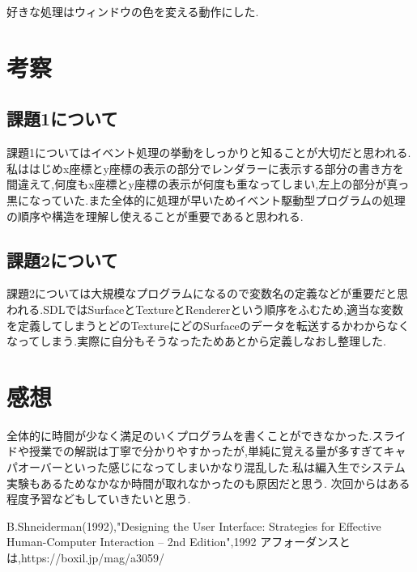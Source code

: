 \documentclass{jarticle}
\begin{document}
	好きな処理はウィンドウの色を変える動作にした.

	\section{考察}
	\subsection{課題1について}
	課題1についてはイベント処理の挙動をしっかりと知ることが大切だと思われる.私ははじめx座標とy座標の表示の部分でレンダラーに表示する部分の書き方を間違えて,何度もx座標とy座標の表示が何度も重なってしまい,左上の部分が真っ黒になっていた.また全体的に処理が早いためイベント駆動型プログラムの処理の順序や構造を理解し使えることが重要であると思われる.
	\subsection{課題2について}
	課題2については大規模なプログラムになるので変数名の定義などが重要だと思われる.SDLではSurfaceとTextureとRendererという順序をふむため,適当な変数を定義してしまうとどのTextureにどのSurfaceのデータを転送するかわからなくなってしまう.実際に自分もそうなったためあとから定義しなおし整理した.
	\section{感想}
	全体的に時間が少なく満足のいくプログラムを書くことができなかった.スライドや授業での解説は丁寧で分かりやすかったが,単純に覚える量が多すぎてキャパオーバーといった感じになってしまいかなり混乱した.私は編入生でシステム実験もあるためなかなか時間が取れなかったのも原因だと思う.
	次回からはある程度予習などもしていきたいと思う.
	\begin{thebibliography}{99}
	 B.Shneiderman(1992),"Designing the User Interface: Strategies for Effective Human-Computer Interaction -- 2nd Edition",1992
	 アフォーダンスとは,https://boxil.jp/mag/a3059/
	\end{thebibliography}
\end{document}
